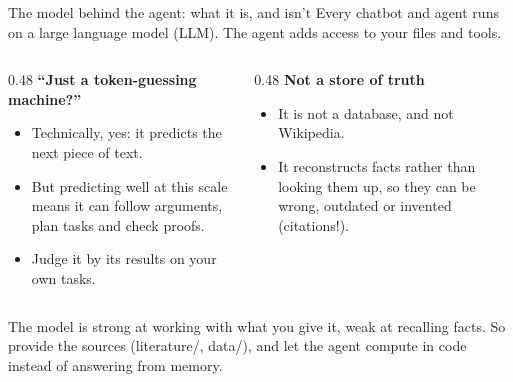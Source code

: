 \documentclass[aspectratio=169,11pt]{beamer}
\newcommand{\icon}[1]{\textcolor{accent}{#1}}
\begin{document}
\begin{frame}{The model behind the agent: what it is, and isn't}
  Every chatbot and agent runs on a large language model (LLM). The agent adds access to your files and tools.
  \vspace{0.2em}
  \begin{columns}[T]
    \begin{column}{0.48\textwidth}
      \icon{\faQuestionCircle}\enspace\textbf{``Just a token-guessing machine?''}
      \begin{itemize}
        \item Technically, yes: it predicts the next piece of text.
        \item But predicting well at this scale means it can follow arguments, plan tasks and check proofs.
        \item Judge it by its results on your own tasks.
      \end{itemize}
    \end{column}
    \begin{column}{0.48\textwidth}
      \icon{\faDatabase}\enspace\textbf{Not a store of truth}
      \begin{itemize}
        \item It is not a database, and not Wikipedia.
        \item It reconstructs facts rather than looking them up, so they can be wrong, outdated or invented (citations!).
      \end{itemize}
    \end{column}
  \end{columns}
  \vspace{0.4em}
  \begin{keybox}
    \icon{\faLightbulb}\enspace The model is strong at working with what you give it, weak at recalling facts. So provide the sources (literature/, data/), and let the agent compute in code instead of answering from memory.
  \end{keybox}
\end{frame}
\end{document}
